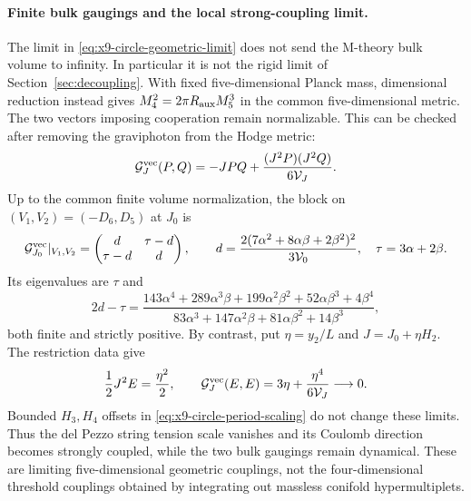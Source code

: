 \paragraph{Finite bulk gaugings and the local strong-coupling limit.}
The limit in \eqref{eq:x9-circle-geometric-limit} does not send the
M-theory bulk volume to infinity. In particular it is not the rigid
limit of Section~\ref{sec:decoupling}. With fixed five-dimensional
Planck mass, dimensional reduction instead gives
$M_4^2=2\pi R_{\rm aux}M_5^3$ in the common five-dimensional metric.
The two vectors imposing cooperation remain normalizable.
This can be checked after removing the graviphoton from the Hodge metric:
\begin{equation}
 \mathcal G_J^{\rm vec}(P,Q)
 =-JPQ+\frac{(J^2P)(J^2Q)}{6\mathcal V_J}.
 \label{eq:x9-circle-projected-metric}
\end{equation}
Up to the common finite volume normalization, the block on
$(V_1,V_2)=(-D_6,D_5)$ at $J_0$ is
\begin{equation}
 \mathcal G_{J_0}^{\rm vec}|_{V_1,V_2}
 =\begin{pmatrix}d&\tau-d\\\tau-d&d\end{pmatrix},\qquad
 d=\frac{2(7\alpha^2+8\alpha\beta+2\beta^2)^2}{3\mathcal V_0},
 \quad\tau=3\alpha+2\beta.
 \label{eq:x9-circle-finite-gaugings}
\end{equation}
Its eigenvalues are $\tau$ and
\begin{equation}
 2d-\tau=
 \frac{143\alpha^4+289\alpha^3\beta+199\alpha^2\beta^2
                       +52\alpha\beta^3+4\beta^4}
      {83\alpha^3+147\alpha^2\beta+81\alpha\beta^2+14\beta^3},
 \label{eq:x9-circle-positive-eigenvalue}
\end{equation}
both finite and strictly positive. By contrast, put
$\eta=y_2/L$ and $J=J_0+\eta H_2$. The restriction data give
\begin{equation}
 \frac12J^2E=\frac{\eta^2}{2},\qquad
 \mathcal G_J^{\rm vec}(E,E)
       =3\eta+\frac{\eta^4}{6\mathcal V_J}\longrightarrow0.
 \label{eq:x9-circle-local-strong-coupling}
\end{equation}
Bounded $H_3,H_4$ offsets in \eqref{eq:x9-circle-period-scaling}
do not change these limits. Thus the del Pezzo string tension scale
vanishes and its Coulomb direction becomes strongly coupled, while
the two bulk gaugings remain dynamical. These are limiting
five-dimensional geometric couplings, not the four-dimensional
threshold couplings obtained by integrating out massless conifold
hypermultiplets.

